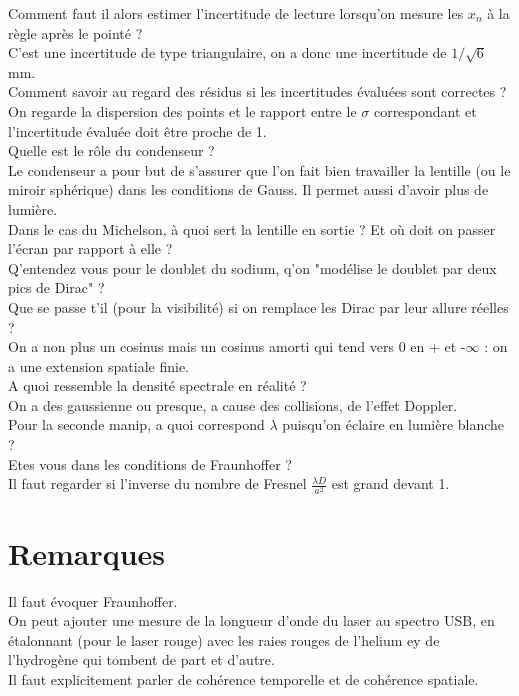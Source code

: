 \documentclass[12pt,prb,aps,epsf]{report}
\begin{document}
Comment faut il alors estimer l'incertitude de lecture lorsqu'on mesure les $x_n$ à la règle après le pointé ?\\
C'est une incertitude de type triangulaire, on a donc une incertitude de $1/\sqrt{6}$ mm.\\

Comment savoir au regard des résidus si les incertitudes évaluées sont correctes ?\\
On regarde la dispersion des points et le rapport entre le $\sigma$ correspondant et l'incertitude évaluée doit être proche de 1.\\

Quelle est le rôle du condenseur ?\\
Le condenseur a pour but de s'assurer que l'on fait bien travailler la lentille (ou le miroir sphérique) dans les conditions de Gauss. Il permet aussi d'avoir plus de lumière.\\

Dans le cas du Michelson, à quoi sert la lentille en sortie ? Et où doit on passer l'écran par rapport à elle ?\\

Q'entendez vous pour le doublet du sodium, q'on "modélise le doublet par deux pics de Dirac" ?\\

Que se passe t'il (pour la visibilité) si on remplace les Dirac par leur allure réelles ?\\
On a non plus un cosinus mais un cosinus amorti qui tend vers 0 en + et -$\infty$ : on a une extension spatiale finie.\\

A quoi ressemble la densité spectrale en réalité ?\\
On a des gaussienne ou presque, a cause des collisions, de l'effet Doppler.\\

Pour la seconde manip, a quoi correspond $\lambda$ puisqu'on éclaire en lumière blanche ?\\

Etes vous dans les conditions de Fraunhoffer ?\\
Il faut regarder si l'inverse du nombre de Fresnel $\frac{\lambda D}{a^2}$ est grand devant 1.



\section*{Remarques}
Il faut évoquer Fraunhoffer.\\
On peut ajouter une mesure de la longueur d'onde du laser au spectro USB, en étalonnant (pour le laser rouge) avec les raies rouges de l'helium ey de l'hydrogène qui tombent de part et d'autre.\\
Il faut explicitement parler de cohérence temporelle et de cohérence spatiale.
	
\end{document}
